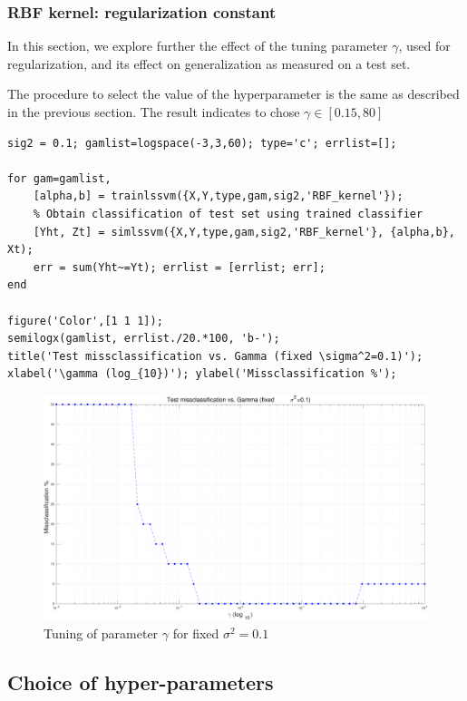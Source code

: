 \documentclass[11pt, a4paper]{article}
\begin{document}
\subsubsection{RBF kernel: regularization constant}

In this section, we explore further the effect of the tuning parameter
$\gamma$, used for regularization, and its effect on generalization as
measured on a test set.

The procedure to select the value of the hyperparameter is the same as described in the previous section. The result indicates to chose $\gamma \in [0.15,80]$
\begin{lstlisting}
sig2 = 0.1; gamlist=logspace(-3,3,60); type='c'; errlist=[];

for gam=gamlist,
    [alpha,b] = trainlssvm({X,Y,type,gam,sig2,'RBF_kernel'});
    % Obtain classification of test set using trained classifier
    [Yht, Zt] = simlssvm({X,Y,type,gam,sig2,'RBF_kernel'}, {alpha,b}, Xt);
    err = sum(Yht~=Yt); errlist = [errlist; err];
end

figure('Color',[1 1 1]);
semilogx(gamlist, errlist./20.*100, 'b-');
title('Test missclassification vs. Gamma (fixed \sigma^2=0.1)');
xlabel('\gamma (log_{10})'); ylabel('Missclassification %');
\end{lstlisting}

\begin{figure}[H]
    \centering
    \includegraphics[scale=.40]{rbf_gamma.pdf}
    \caption{Tuning of parameter $\gamma$ for fixed $\sigma^2=0.1$}
    \label{fig:rbf_gamma}
\end{figure}

\subsection{Choice of hyper-parameters}
\end{document}

